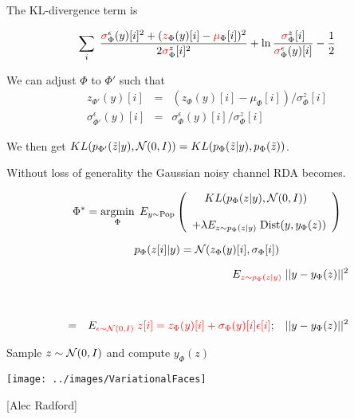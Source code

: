 {

The KL-divergence term is
    
$$\sum_i \;\frac{{\color{red} \sigma}^\epsilon_\Phi(y)[i]^2 +({\color{red}
z}_\Phi(y)[i] - {\color{red} \mu}_\Phi[i])^2}{2
{\color{red} \sigma}^z_\Phi[i]^2}
+ \ln\frac{{\color{red} \sigma}^z_\Phi[i]}{{\color{red} \sigma}^\epsilon_\Phi(y)[i]}
- \frac{1}{2}$$

\vfill
We can adjust $\Phi$ to $\Phi'$ such that
\begin{eqnarray*}
z_{\Phi'}(y)[i] & = & (z_\Phi(y)[i] - \mu_\Phi[i])/\sigma^z_\Phi[i] \\
\sigma^\epsilon_{\Phi'}(y)[i] & = & \sigma^\epsilon_\Phi(y)[i]/\sigma^z_\Phi[i]
\end{eqnarray*}

\vfill
We then get {\color{red} $KL(p_{\Phi'}(\tilde{z}|y),{\cal N}(0,I)) = KL(p_{\Phi}(\tilde{z}|y),p_\Phi(\tilde{z}))$}.


\vfill
Without loss of generality the Gaussian noisy channel RDA becomes.

{\color{red} $$\Phi^* = \operatorname*{argmin}_{\Phi}\; E_{y \sim \mathrm{Pop}}\left(\begin{array}{l}\;\;\;\;KL(p_\Phi(z|y),{\cal N}(0,I)) \\
\\
+ \lambda E_{z \sim p_\Phi(z|y)}\;\mathrm{Dist}(y,y_\Phi(z))\end{array}\right) $$}


$$p_\Phi(z[i]|y) = {\cal N}(z_\Phi(y)[i],\sigma_\Phi[i])$$

\vfill
\begin{eqnarray*}
& & E_{\color{red} z \sim p_\Phi(z|y)} \;||y - y_\Phi(z)||^2 \\
\\
\\
& = & E_{\color{red} \epsilon \sim {\cal N}(0,I)} \;{\color{red} z[i] = z_\Phi(y)[i] + \sigma_\Phi(y)[i]\epsilon[i]};\;\; \;||y -y_\Phi(z)||^2
\end{eqnarray*}


\centerline{Sample {\color{red} $z \sim {\cal N}(0,I)$} and compute {\color{red} $y_\Phi(z)$}}
\vfill
\centerline{\texttt{[image: ../images/VariationalFaces]}}
\centerline{[Alec Radford]}



}
